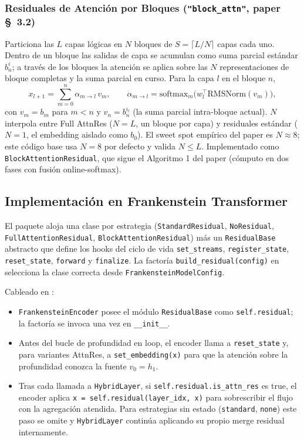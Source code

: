 \subsubsection{Residuales de Atención por Bloques (\texttt{"block\_attn"}, paper \S~3.2)}

Particiona las $L$ capas lógicas en $N$ bloques de
$S = \lceil L / N \rceil$ capas cada uno. Dentro de un bloque las
salidas de capa se acumulan como suma parcial estándar $b_n^i$; a
través de los bloques la atención se aplica sobre las $N$
representaciones de bloque completas y la suma parcial en curso.
Para la capa $l$ en el bloque $n$,
\[
x_{l+1} = \sum_{m=0}^{n} \alpha_{m \to l} \, v_m, \qquad
\alpha_{m \to l} = \mathrm{softmax}_m\!\big(w_l^{\top} \mathrm{RMSNorm}(v_m)\big),
\]
con $v_m = b_m$ para $m < n$ y $v_n = b_n^{i_l}$ (la suma parcial
intra-bloque actual). $N$ interpola entre Full AttnRes ($N = L$, un
bloque por capa) y residuales estándar ($N = 1$, el embedding aislado
como $b_0$). El sweet spot empírico del paper es $N \approx 8$; este
código base usa $N = 8$ por defecto y valida $N \le L$. Implementado
como \texttt{BlockAttentionResidual}, que sigue el Algoritmo 1 del
paper (cómputo en dos fases con fusión online-softmax).

\subsection{Implementación en Frankenstein Transformer}

El paquete  aloja una clase por estrategia
(\texttt{StandardResidual}, \texttt{NoResidual},
\texttt{FullAttentionResidual}, \texttt{BlockAttentionResidual}) más
un \texttt{ResidualBase} abstracto que define los hooks del ciclo de
vida \texttt{set\_streams}, \texttt{register\_state},
\texttt{reset\_state}, \texttt{forward} y \texttt{finalize}. La factoría
\texttt{build\_residual(config)} en 
selecciona la clase correcta desde \texttt{FrankensteinModelConfig}.

Cableado en :
\begin{itemize}[leftmargin=*]
    \item \texttt{FrankensteinEncoder} posee el módulo
        \texttt{ResidualBase} como \texttt{self.residual}; la factoría
        se invoca una vez en \texttt{\_\_init\_\_}.
    \item Antes del bucle de profundidad en loop, el encoder llama a
        \texttt{reset\_state} y, para variantes AttnRes, a
        \texttt{set\_embedding(x)} para que la atención sobre la
        profundidad conozca la fuente $v_0 = h_1$.
    \item Tras cada llamada a \texttt{HybridLayer}, si
        \texttt{self.residual.is\_attn\_res} es true, el encoder aplica
        \texttt{x = self.residual(layer\_idx, x)} para sobrescribir el
        flujo con la agregación atendida. Para estrategias sin estado
        (\texttt{standard}, \texttt{none}) este paso se omite y
        \texttt{HybridLayer} continúa aplicando su propio merge
        residual internamente.
\end{itemize}

